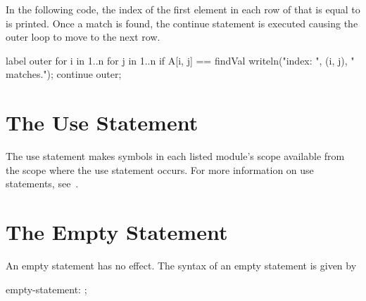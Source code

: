 \begin{example}
In the following code, the index of the first element in each row of
 that is equal to  is printed.  Once a match is
found, the continue statement is executed causing the outer loop to
move to the next row.
\begin{chapel}
label outer for i in 1..n {
  for j in 1..n {
    if A[i, j] == findVal {
      writeln("index: ", (i, j), " matches.");
      continue outer;
    }
  }
}
\end{chapel}
\end{example}

\section{The Use Statement}
\label{The_Use_Statement}

The use statement makes symbols in each listed module's scope
available from the scope where the use statement occurs.  For more
information on use statements, see~.

\section{The Empty Statement}
\label{The_Empty_Statement}

An empty statement has no effect.  The syntax of an empty statement is
given by
\begin{syntax}
empty-statement:
  ;
\end{syntax}

